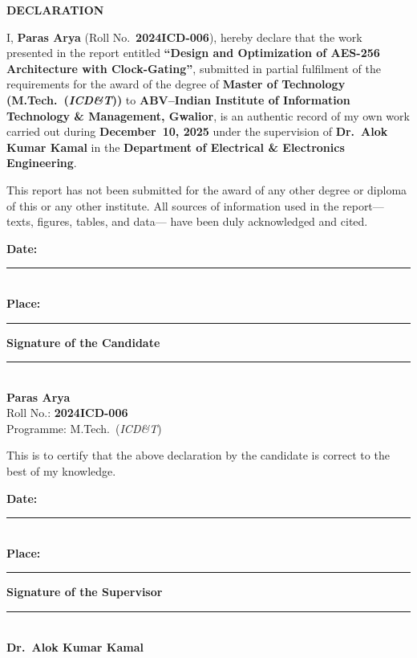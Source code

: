 \documentclass[12pt,a4paper]{report}
\newcommand{\ThesisTitle}{Design and Optimization of AES-256 Architecture
with Clock-Gating}
\newcommand{\Programme}{M.Tech.\ (\textit{ICD\&T})}
\newcommand{\Department}{Department of Electrical \& Electronics Engineering}
\newcommand{\AuthorName}{Paras Arya}
\newcommand{\RollNo}{2024ICD-006}
\newcommand{\Supervisor}{Dr.\ Alok Kumar Kamal}
\newcommand{\InstituteName}{ABV--Indian Institute of Information Technology \& Management, Gwalior}
\newcommand{\SessionDates}{December~10, 2025}
\begin{document}
\cleardoublepage
{}   %
\thispagestyle{empty}
\begin{center}
  {\Large \textbf{DECLARATION}}
\end{center}
\vspace{0.8cm}

I, \textbf{\AuthorName} (Roll No.\ \textbf{\RollNo}), hereby declare that the work presented
in the report entitled \textbf{``\ThesisTitle''}, submitted in partial fulfilment of the
requirements for the award of the degree of \textbf{Master of Technology (\Programme)} to
\textbf{\InstituteName}, is an authentic record of my own work carried out during
\textbf{\SessionDates} under the supervision of \textbf{\Supervisor} in the \textbf{\Department}.

\vspace{0.6cm}
This report has not been submitted for the award of any other degree or diploma of this or any
other institute. All sources of information used in the report—texts, figures, tables, and data—
have been duly acknowledged and cited.

\vspace{1.2cm}
\noindent
\begin{minipage}[t]{0.48\textwidth}
  \textbf{Date:} \rule{5cm}{0.4pt}\\[0.6cm]
  \textbf{Place:} \rule{4.8cm}{0.4pt}
\end{minipage}\hfill
\begin{minipage}[t]{0.48\textwidth}
  \raggedleft
  \textbf{Signature of the Candidate}\\[0.6cm]
  \rule{6cm}{0.4pt}\\[-0.1cm]
  \textbf{\AuthorName}\\
  Roll No.: \textbf{\RollNo}\\
  Programme: \Programme
\end{minipage}

\vspace{1.6cm}
\noindent
This is to certify that the above declaration by the candidate is correct to the best of my knowledge.

\vspace{1.2cm}
\noindent
\begin{minipage}[t]{0.48\textwidth}
  \textbf{Date:} \rule{5cm}{0.4pt}\\[0.6cm]
  \textbf{Place:} \rule{4.8cm}{0.4pt}
\end{minipage}\hfill
\begin{minipage}[t]{0.48\textwidth}
  \raggedleft
  \textbf{Signature of the Supervisor}\\[0.6cm]
  \rule{6cm}{0.4pt}\\[-0.1cm]
  \textbf{\Supervisor}
\end{minipage}
\end{document}
